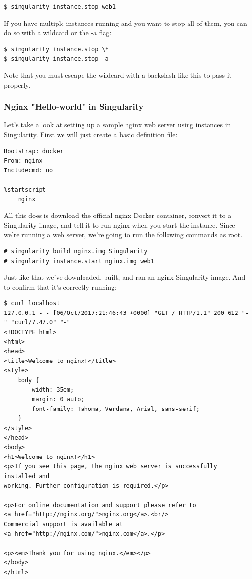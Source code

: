 \documentclass[a4paper]{article}
\begin{document}
\begin{lstlisting}[frame=single]  
$ singularity instance.stop web1
\end{lstlisting}

If you have multiple instances running and you want to stop all of them, you can do so with a wildcard or the -a flag:\\[0.1in]


\begin{lstlisting}[frame=single]  
$ singularity instance.stop \*
$ singularity instance.stop -a
\end{lstlisting}

Note that you must escape the wildcard with a backslash like this \* to pass it properly.

\subsubsection{Nginx "Hello-world" in Singularity}

Let’s take a look at setting up a sample nginx web server using instances in Singularity. First we will just create a basic definition file:

\begin{lstlisting}[frame=single]  
Bootstrap: docker
From: nginx
Includecmd: no

%startscript
	nginx
\end{lstlisting}

All this does is download the official nginx Docker container, convert it to a Singularity image, and tell it to run nginx when you start the instance. Since we’re running a web server, we’re going to run the following commands as root.

\begin{lstlisting}[frame=single] 
# singularity build nginx.img Singularity
# singularity instance.start nginx.img web1 
\end{lstlisting}

Just like that we’ve downloaded, built, and ran an nginx Singularity image. And to confirm that it’s correctly running:

\begin{lstlisting}[frame=single]  
$ curl localhost
127.0.0.1 - - [06/Oct/2017:21:46:43 +0000] "GET / HTTP/1.1" 200 612 "-" "curl/7.47.0" "-"
<!DOCTYPE html>
<html>
<head>
<title>Welcome to nginx!</title>
<style>
    body {
        width: 35em;
        margin: 0 auto;
        font-family: Tahoma, Verdana, Arial, sans-serif;
    }
</style>
</head>
<body>
<h1>Welcome to nginx!</h1>
<p>If you see this page, the nginx web server is successfully installed and
working. Further configuration is required.</p>

<p>For online documentation and support please refer to
<a href="http://nginx.org/">nginx.org</a>.<br/>
Commercial support is available at
<a href="http://nginx.com/">nginx.com</a>.</p>

<p><em>Thank you for using nginx.</em></p>
</body>
</html>

\end{lstlisting}
\end{document}
